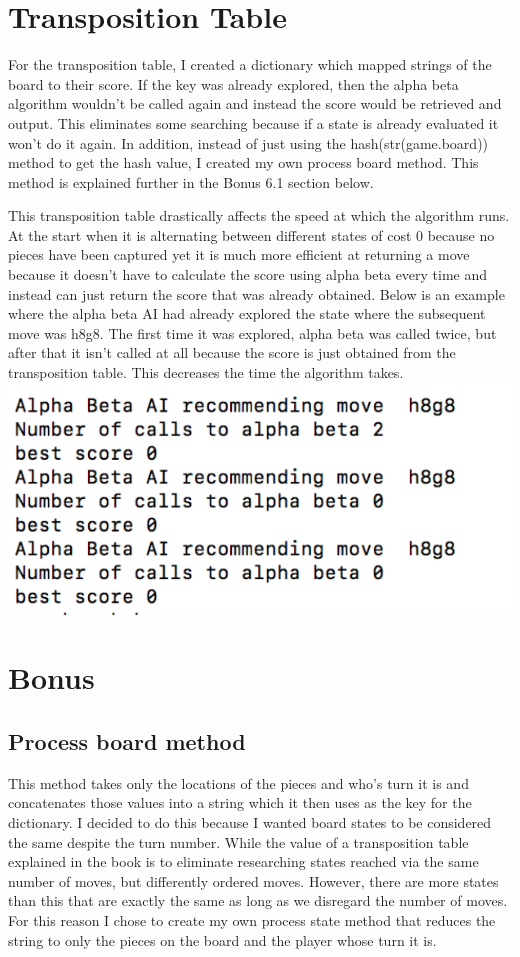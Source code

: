 \documentclass{article}
\begin{document}
\section{Transposition Table}
For the transposition table, I created a dictionary which mapped strings of the board to their score. If the key was already explored, then the alpha beta algorithm wouldn't be called again and instead the score would be retrieved and output. This eliminates some searching because if a state is already evaluated it won't do it again. In addition, instead of just using the hash(str(game.board)) method to get the hash value, I created my own process board method. This method is explained further in the Bonus 6.1 section below.

This transposition table drastically affects the speed at which the algorithm runs. At the start when it is alternating between different states of cost 0 because no pieces have been captured yet it is much more efficient at returning a move because it doesn't have to calculate the score using alpha beta every time and instead can just return the score that was already obtained. Below is an example where the alpha beta AI had already explored the state where the subsequent move was h8g8. The first time it was explored, alpha beta was called twice, but after that it isn't called at all because the score is just obtained from the transposition table. This decreases the time the algorithm takes. 
\includegraphics[width=\textwidth]{transposition_table.pdf}

\section{Bonus}

\subsection{Process board method}
This method takes only the locations of the pieces and who's turn it is and concatenates those values into a string which it then uses as the key for the dictionary. I decided to do this because I wanted board states to be considered the same despite the turn number. While the value of a transposition table explained in the book is to eliminate researching states reached via the same number of moves, but differently ordered moves. However, there are more states than this that are exactly the same as long as we disregard the number of moves. For this reason I chose to create my own process state method that reduces the string to only the pieces on the board and the player whose turn it is. 
\end{document}
